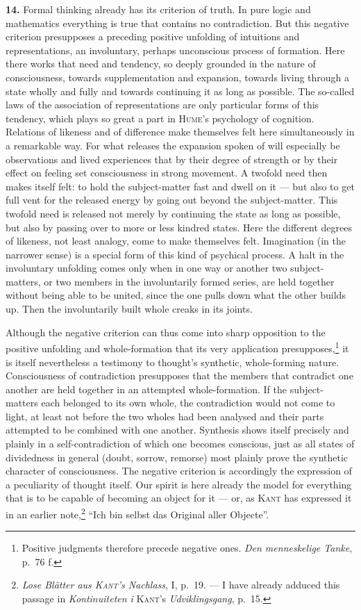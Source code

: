 \documentclass[12pt]{book}
\newcommand{\hnum}[1]{\textbf{#1.}\enspace}
\newcommand{\opage}[1]{\marginnote{\footnotesize\textit{[#1]}}}
\begin{document}
\opage{38}\hnum{14} Formal thinking already has its criterion of truth. In pure logic and
mathematics everything is true that contains no contradiction. But this negative
criterion presupposes a preceding positive unfolding of intuitions and
representations, an involuntary, perhaps unconscious process of formation. Here
there works that need and tendency, so deeply grounded in the nature of
consciousness, towards supplementation and expansion, towards living through a
state wholly and fully and towards continuing it as long as possible. The
so-called laws of the association of representations are only particular forms of
this tendency, which plays so great a part in \textsc{Hume}'s psychology of
cognition. Relations of likeness and of difference make themselves felt here
simultaneously in a remarkable way. For what releases the expansion spoken of
will especially be observations and lived experiences that by their degree of
strength or by their effect on feeling set consciousness in strong movement. A
twofold need then makes itself felt: to hold the subject-matter fast and dwell on
it --- but also to get full vent for the released energy by going out beyond the
subject-matter. This twofold need is released not merely by continuing the state
as long as possible, but also by passing over to more or less kindred states.
Here the different degrees of likeness, not least analogy, come to make
themselves felt. Imagination (in the narrower sense) is a special form of this
kind of psychical process. A halt in the involuntary unfolding comes only when in
one way or another two subject-matters, or two members in the involuntarily
formed series, are held together without being able to be united, since the one
pulls down what the other builds up. Then the involuntarily built whole creaks in
its joints.

Although the negative criterion can thus come into sharp opposition to the
positive unfolding and whole-formation that its very application
presupposes,\footnote{Positive judgments therefore precede negative ones.
\textit{Den menneskelige Tanke}, p.\ 76 f.} it is itself nevertheless a testimony
to thought's synthetic, whole-forming nature. Consciousness of contradiction
presupposes that the members that contradict one another are held together in an
attempted whole-formation. If the subject-matters each belonged to its own whole,
the contradiction would not come to light, at least not before the two wholes had
been analysed and their parts attempted to be combined with one another. Synthesis
shows itself precisely and plainly in a self-contradiction of which one becomes
conscious, just as all states of dividedness in general (doubt, sorrow, remorse)
most plainly prove the synthetic character of consciousness. The negative
criterion is accordingly the expression of a peculiarity of thought itself. Our
spirit is here already the model for everything that is to be capable of becoming
an object for it --- or, as \textsc{Kant} has expressed it in an earlier
note,\footnote{\textit{Lose Blätter aus \textsc{Kant}'s Nachlass}, I, p.\ 19. ---
I have already adduced this passage in \textit{Kontinuiteten i} \textsc{Kant}'s
\textit{Udviklingsgang}, p.\ 15.} ``Ich bin selbst das Original aller Objecte''.
\end{document}
